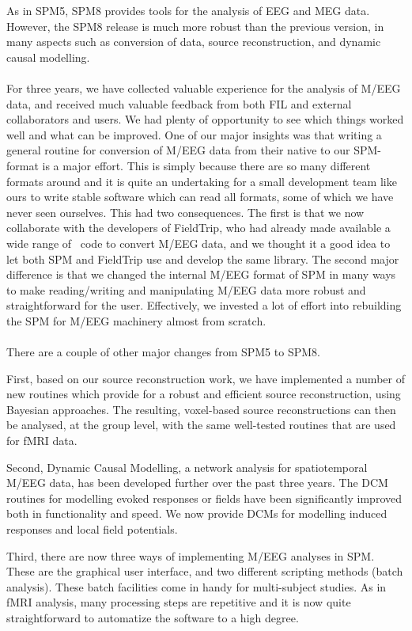  As in SPM5, SPM8 provides tools for the analysis of EEG and MEG data. However, the SPM8 release is much more robust than the previous version, in many aspects such as conversion of data, source reconstruction, and dynamic causal modelling.
\\
\\
For three years, we have collected valuable experience for the analysis of M/EEG data, and received much valuable feedback from both FIL and external collaborators and users. We had plenty of opportunity to see which things worked well and what can be improved. One of our major insights was that writing a general routine for conversion of M/EEG data from their native to our SPM-format is a major effort. This is simply because there are so many different formats around and it is quite an undertaking for a small development team like ours to write stable software which can read all formats, some of which we have never seen ourselves. This had two consequences. The first is that we now collaborate with the developers of FieldTrip, who had already made available a wide range of \matlab\ code to convert M/EEG data, and we thought it a good idea to let both SPM and FieldTrip use and develop the same library. The second major difference is that we changed the internal M/EEG format of SPM in many ways to make reading/writing and manipulating M/EEG data more robust and straightforward for the user. Effectively, we invested a lot of effort into rebuilding the SPM for M/EEG machinery almost from scratch.
\\
\\
There are a couple of other major changes from SPM5 to SPM8.

First, based on our source reconstruction work, we have implemented a number of new routines which provide for a robust and efficient source reconstruction, using Bayesian approaches. The resulting, voxel-based source reconstructions can then be analysed, at the group level, with the same well-tested routines that are used for fMRI data.

Second, Dynamic Causal Modelling, a network analysis for spatiotemporal M/EEG data, has been developed further over the past three years. The DCM routines for modelling evoked responses or fields have been significantly improved both in functionality and speed. We now provide DCMs for modelling induced responses and local field potentials.

Third, there are now three ways of implementing M/EEG analyses in SPM. These are the graphical user interface, and two different scripting methods (batch analysis). These batch facilities come in handy for multi-subject studies. As in fMRI analysis, many processing steps are repetitive and it is now quite straightforward to automatize the software to a high degree.

